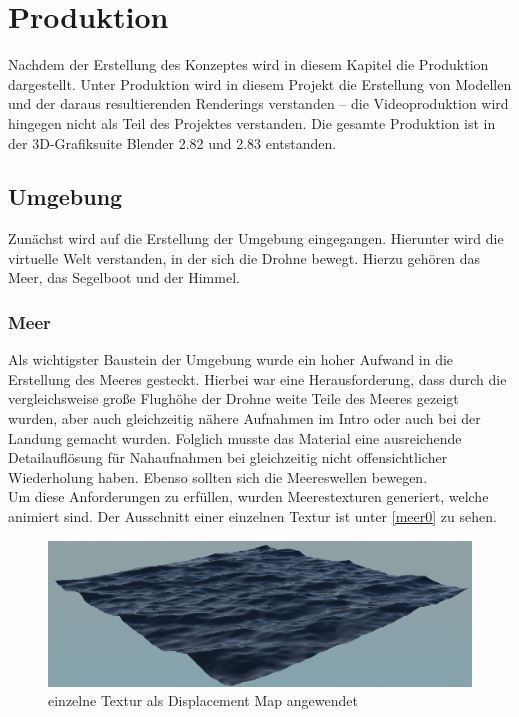 \chapter{Produktion}
Nachdem der Erstellung des Konzeptes wird in diesem Kapitel die Produktion dargestellt. Unter Produktion wird in diesem Projekt die Erstellung von Modellen und der daraus resultierenden Renderings verstanden -- die Videoproduktion wird hingegen nicht als Teil des Projektes verstanden. Die gesamte Produktion ist in der 3D-Grafiksuite Blender 2.82 und 2.83 entstanden.

\section{Umgebung}

Zunächst wird auf die Erstellung der Umgebung eingegangen. Hierunter wird die virtuelle Welt verstanden, in der sich die Drohne bewegt. Hierzu gehören das Meer, das Segelboot und der Himmel.

\subsection{Meer}

Als wichtigster Baustein der Umgebung wurde ein hoher Aufwand in die Erstellung des Meeres gesteckt. Hierbei war eine Herausforderung, dass durch die vergleichsweise große Flughöhe der Drohne weite Teile des Meeres gezeigt wurden, aber auch gleichzeitig nähere Aufnahmen im Intro oder auch bei der Landung gemacht wurden. Folglich musste das Material eine ausreichende Detailauflösung für Nahaufnahmen bei gleichzeitig nicht offensichtlicher Wiederholung haben. Ebenso sollten sich die Meereswellen bewegen.\\
Um diese Anforderungen zu erfüllen, wurden Meerestexturen generiert, welche animiert sind. Der Ausschnitt einer einzelnen Textur ist unter \autoref{meer0} zu sehen. 

\begin{figure}[H]
\includegraphics[width=\textwidth]{gfx/prod/ocean/meer0.jpg}
\caption{einzelne Textur als Displacement Map angewendet}
\label{meer0}
\end{figure}

